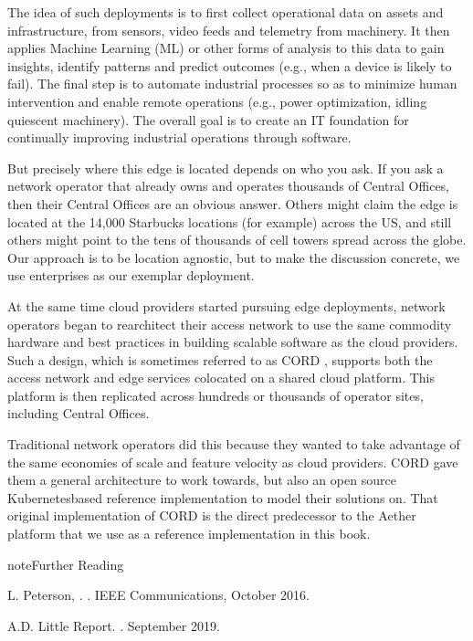 \documentclass[a4paper,11pt,english]{sphinxmanual}
\begin{document}
\sphinxAtStartPar
The idea of such deployments is to first collect operational data on
assets and infrastructure, from sensors, video feeds and telemetry
from machinery. It then applies Machine Learning (ML) or other forms
of analysis to this data to gain insights, identify patterns and
predict outcomes (e.g., when a device is likely to fail). The final
step is to automate industrial processes so as to minimize human
intervention and enable remote operations (e.g., power optimization,
idling quiescent machinery). The overall goal is to create an IT
foundation for continually improving industrial operations through
software.

\sphinxAtStartPar
But precisely where this edge is  located depends on who
you ask. If you ask a network operator that already owns and operates
thousands of Central Offices, then their Central Offices are an
obvious answer. Others might claim the edge is located at the 14,000
Starbucks locations (for example) across the US, and still others might
point to the tens of thousands of cell towers spread across the globe.
Our approach is to be location agnostic, but to make the discussion
concrete, we use enterprises as our exemplar deployment.

\sphinxAtStartPar
At the same time cloud providers started pursuing edge deployments,
network operators began to re\sphinxhyphen{}architect their access network to use
the same commodity hardware and best practices in building scalable
software as the cloud providers. Such a design, which is sometimes
referred to as CORD ,
supports both the access network and edge services co\sphinxhyphen{}located on a
shared cloud platform. This platform is then replicated across
hundreds or thousands of operator sites, including Central Offices.

\sphinxAtStartPar
Traditional network operators did this because they wanted to take
advantage of the same economies of scale and feature velocity as cloud
providers. CORD gave them a general architecture to work towards, but
also an open source Kubernetes\sphinxhyphen{}based reference implementation to model
their solutions on. That original implementation of CORD is the direct
predecessor to the Aether platform that we use as a reference
implementation in this book.

\label{\detokenize{intro:reading-cord}}
\begin{sphinxadmonition}{note}{Further Reading}

\sphinxAtStartPar
L. Peterson, . .
IEEE Communications, October 2016.

\sphinxAtStartPar
A.D. Little Report. .  September 2019.
\end{sphinxadmonition}
\end{document}
